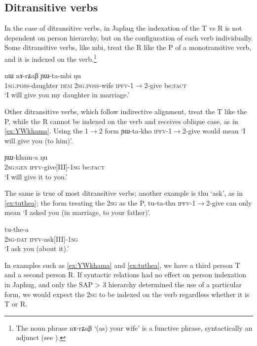 \documentclass[oldfontcommands,oneside,a4paper,11pt]{article}
\newcommand{\ipa}[1]{{\phon \mbox{#1}}} %
\begin{document}
\subsection{Ditransitive verbs}
In the case of ditransitive verbs, in Japhug the indexation of the T vs R is not dependent on person hierarchy, but on the configuration of each verb individually. Some ditransitive verbs, like \ipa{mbi}, treat the R like the P of a monotransitive verb, and it is indexed on the verb.\footnote{The noun phrase \ipa{nɤ-rʑaβ} `(as) your wife' is a functive phrase, syntactically an adjunct (see \citealt{creissels14functive}).}

\begin{exe}
\ex \label{ex:YWtambi}
\gll \ipa{a-me} 	\ipa{nɯ} 	\ipa{nɤ-rʑaβ} 	\ipa{ɲɯ-ta-mbi} 	\ipa{ŋu} \\
\textsc{1sg.poss}-daughter \textsc{dem} \textsc{2sg.poss}-wife \textsc{ipfv}-1$\rightarrow$2-give be:\textsc{fact} \\
\glt `I will give you my daughter in marriage.'
\end{exe}

Other ditransitive verbs, which follow indirective alignment, treat the T like the P, while the R cannot be indexed on the verb and receives oblique case, as in \ref{ex:YWkhama}. Using the 1$\rightarrow$2 form \ipa{ɲɯ-ta-kho} \textsc{ipfv}-1$\rightarrow$2-give would mean `I will give you (to him)'.

\begin{exe}
\ex \label{ex:YWkhama}
\gll \ipa{nɤʑɯɣ} 	\ipa{ɲɯ-kham-a} \ipa{ŋu} \\
\textsc{2sg:gen} \textsc{ipfv}-give[III]-\textsc{1sg} be:\textsc{fact} \\
\glt `I will give it to you.'
\end{exe}

The same is true of most ditransitive verbs; another example is \ipa{thu} `ask', as in \ref{ex:tuthea}; the form treating the \textsc{2sg} as the P, \ipa{tu-ta-thu} \textsc{ipfv}-1$\rightarrow$2-give can only mean `I asked you (in marriage, to your father)'.

\begin{exe}
\ex \label{ex:tuthea}
\gll \ipa{nɤ-ɕki} 	\ipa{tu-the-a} \\
\textsc{2sg-dat} \textsc{ipfv}-ask[III]-\textsc{1sg} \\
\glt `I ask you (about it).'
\end{exe}

In examples such as \ref{ex:YWkhama} and \ref{ex:tuthea}, we have a third person T and a second person R. If syntactic relations had no effect on person indexation in Japhug, and only the SAP > 3 hierarchy determined the use of a particular form, we would expect the \textsc{2sg} to be indexed on the verb regardless whether it is T or R.
\end{document}
